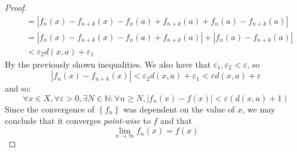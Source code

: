 \documentclass{article}
\newcommand{\abs}[1]{\left|#1\right|}
\newcommand{\bracks}[1]{\left\{#1\right\}}
\newcommand{\vep}{\varepsilon}
\newcommand{\N}{\mathbb{N}}
\begin{document}
\begin{proof}
\begin{align*}
            &= \abs{f_n(x) - f_{n+k}(x) - f_n(a) + f_{n+k}(a) + 
            f_n(a) - f_{n+k}(a)} \\
            &= \abs{f_n(x) - f_{n+k}(x) - f_n(a) + f_{n+k}(a)} + 
            \abs{f_n(a) - f_{n+k}(a)} \\
            &< \vep_2d(x,a) + \vep_1
            \end{align*}
            By the previously shown inequalities. We also have that 
            $\vep_1, \vep_2 < \vep$, so
            $$\abs{f_n(x) - f_{n+k}(x)} < \vep_2d(x,a) + \vep_1 < 
            \vep d(x,a) + \vep$$
            and so:
            $$\forall x \in X, \forall \vep > 0, \exists N \in \N : 
            \forall n \geq N, \abs{f_n(x) - f(x)} < 
            \vep(d(x,a) + 1)$$
            Since the convergence of $\bracks{f_n}$ was dependent on 
            the value of $x$, we may conclude that it converges
            \emph{point-wise} to $f$ and that
            $$\lim_{n\to\infty}f_n(x) = f(x)$$
            \end{proof}
            
\end{document}
